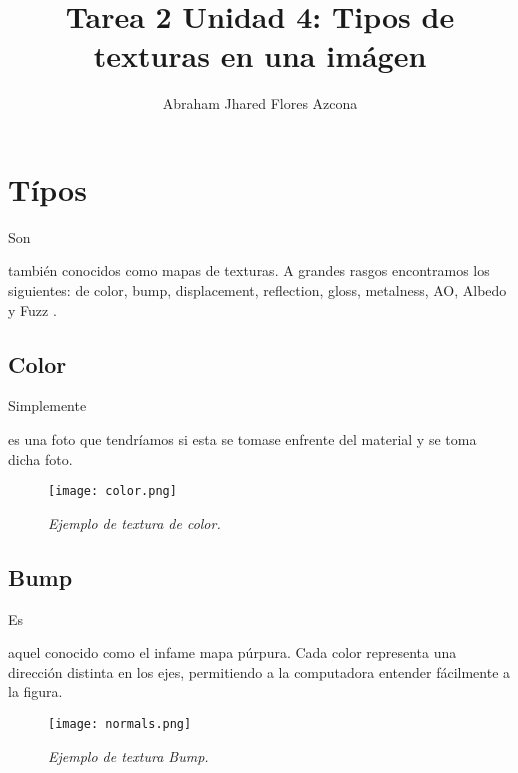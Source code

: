 \documentclass[stu, 12pt, letterpaper, donotrepeattitle, floatsintext, natbib]{apa7}
\title{\Large Tarea 2 Unidad 4: Tipos de texturas en una imágen}
\author{Abraham Jhared Flores Azcona} %
\affiliation{Instituto Tecnológico de Tijuana}
\begin{document}
    \maketitle

    \renewcommand\contentsname{Contenido}
    \tableofcontents
    \renewcommand{\listfigurename}{Figuras}
    \listoffigures

    \newpage
    \section{Típos}
    Son \begin{justifying}
      también conocidos como mapas de texturas. A grandes rasgos encontramos los siguientes:
      de color, bump, displacement, reflection, gloss, metalness, AO, Albedo y Fuzz \citep{barber-no-date}.
    \end{justifying}
    \vspace{\baselineskip}
    \subsection{Color}
    Simplemente \begin{justifying}
      es una foto que tendríamos si esta se tomase enfrente del material y se toma dicha foto.\par
    \end{justifying}
    \begin{figure}[H]
      \caption{\emph{Ejemplo de textura de color.}}
      \centering
      \texttt{[image: color.png]}
      \bigskip
    \end{figure}
    \subsection{Bump}
    Es \begin{justifying}
      aquel conocido como el infame mapa púrpura. Cada color representa una dirección distinta en los ejes, permitiendo a la computadora
      entender fácilmente a la figura.\par
    \end{justifying}
    \begin{figure}[H]
      \caption{\emph{Ejemplo de textura Bump.}}
      \centering
      \texttt{[image: normals.png]}
      \bigskip
    \end{figure}
\end{document}
